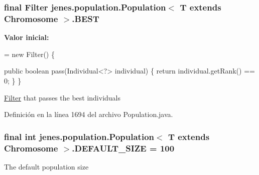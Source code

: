 \hypertarget{classjenes_1_1population_1_1_population_3_01_t_01extends_01_chromosome_01_4_abf7824fc3827456cc071a313586adf20}{
\subsubsection[{B\-E\-S\-T}]{\setlength{\rightskip}{0pt plus 5cm}final Filter jenes.\-population.\-Population$<$ T extends Chromosome $>$.B\-E\-S\-T\hspace{0.3cm}{\ttfamily [static]}}}\label{classjenes_1_1population_1_1_population_3_01_t_01extends_01_chromosome_01_4_abf7824fc3827456cc071a313586adf20}
{\bfseries Valor inicial\-:}
\begin{DoxyCode}
= \textcolor{keyword}{new} Filter() \{

        \textcolor{keyword}{public} \textcolor{keywordtype}{boolean} pass(Individual<?> individual) \{
            \textcolor{keywordflow}{return} individual.getRank() == 0;
        \}
    \}
\end{DoxyCode}
\hyperlink{interfacejenes_1_1population_1_1_population_3_01_t_01extends_01_chromosome_01_4_1_1_filter}{Filter} that passes the best individuals 

Definición en la línea 1694 del archivo Population.\-java.

\hypertarget{classjenes_1_1population_1_1_population_3_01_t_01extends_01_chromosome_01_4_aada0b23838115e85378efcd67c1904e3}{
\subsubsection[{D\-E\-F\-A\-U\-L\-T\-\_\-\-S\-I\-Z\-E}]{\setlength{\rightskip}{0pt plus 5cm}final int jenes.\-population.\-Population$<$ T extends Chromosome $>$.D\-E\-F\-A\-U\-L\-T\-\_\-\-S\-I\-Z\-E = 100\hspace{0.3cm}{\ttfamily [static]}}}\label{classjenes_1_1population_1_1_population_3_01_t_01extends_01_chromosome_01_4_aada0b23838115e85378efcd67c1904e3}
The default population size 

